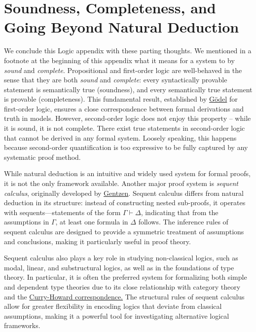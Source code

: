 \section{Soundness, Completeness, and Going Beyond Natural Deduction}

We conclude this Logic appendix with these parting thoughts. We mentioned in a footnote at the beginning of this appendix what it means for a system to by \textit{sound} and \textit{complete}. 
Propositional and first-order logic are well-behaved in the sense that they are both \textit{sound} and \textit{complete}: every syntactically provable statement is semantically true (soundness), 
and every semantically true statement is provable (completeness). This fundamental result, established by \href{https://en.wikipedia.org/wiki/Kurt_G%C3%B6del}{G\"{o}del} for first-order logic, 
ensures a close correspondence between formal derivations and truth in models. However, second-order logic does not enjoy this property -- while it is sound, it is not complete. There exist 
true statements in second-order logic that cannot be derived in any formal system. Loosely speaking, this happens because second-order quantification is too expressive to be fully captured 
by any systematic proof method.

While natural deduction is an intuitive and widely used system for formal proofs, it is not the only framework available. Another major proof system is \textit{sequent calculus}, 
originally developed by \href{https://en.wikipedia.org/wiki/Gerhard_Gentzen}{Gentzen}. Sequent calculus differs from natural deduction in its structure: instead of constructing nested sub-proofs, 
it operates with sequents—statements of the form \( \Gamma \vdash \Delta \), indicating that from the assumptions in \( \Gamma \), at least one formula in \( \Delta \) follows. The inference 
rules of sequent calculus are designed to provide a symmetric treatment of assumptions and conclusions, making it particularly useful in proof theory.

Sequent calculus also plays a key role in studying non-classical logics, such as modal, linear, and substructural logics, as well as in the foundations of type theory. In particular, it is 
often the preferred system for formalizing both simple and dependent type theories due to its close relationship with category theory and the \href{https://en.wikipedia.org/wiki/Curry%E2%80%93Howard_correspondence}{Curry-Howard correspondence.} The structural rules 
of sequent calculus allow for greater flexibility in encoding logics that deviate from classical assumptions, making it a powerful tool for investigating alternative logical frameworks.

